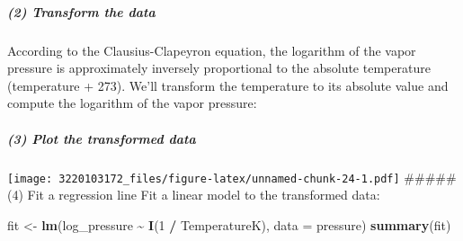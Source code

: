 \documentclass[
]{article}
\newenvironment{Shaded}{\begin{snugshade}}{\end{snugshade}}
\newcommand{\AttributeTok}[1]{\textcolor[rgb]{0.13,0.29,0.53}{#1}}
\newcommand{\DecValTok}[1]{\textcolor[rgb]{0.00,0.00,0.81}{#1}}
\newcommand{\FunctionTok}[1]{\textcolor[rgb]{0.13,0.29,0.53}{\textbf{#1}}}
\newcommand{\NormalTok}[1]{#1}
\newcommand{\OtherTok}[1]{\textcolor[rgb]{0.56,0.35,0.01}{#1}}
\newcommand{\SpecialCharTok}[1]{\textcolor[rgb]{0.81,0.36,0.00}{\textbf{#1}}}
\newcommand{\StringTok}[1]{\textcolor[rgb]{0.31,0.60,0.02}{#1}}
\begin{document}
\subparagraph{(2) Transform the data}\label{transform-the-data}

According to the Clausius-Clapeyron equation, the logarithm of the vapor
pressure is approximately inversely proportional to the absolute
temperature (temperature + 273). We'll transform the temperature to its
absolute value and compute the logarithm of the vapor pressure:

\begin{Shaded}
\end{Shaded}

\subparagraph{(3) Plot the transformed
data}\label{plot-the-transformed-data}

\begin{Shaded}
\end{Shaded}

\texttt{[image: 3220103172\_files/figure-latex/unnamed-chunk-24-1.pdf]}
\#\#\#\#\# (4) Fit a regression line Fit a linear model to the
transformed data:

\begin{Shaded}
\begin{Highlighting}[]
\NormalTok{fit }\OtherTok{\textless{}{-}} \FunctionTok{lm}\NormalTok{(log\_pressure }\SpecialCharTok{\textasciitilde{}} \FunctionTok{I}\NormalTok{(}\DecValTok{1} \SpecialCharTok{/}\NormalTok{ TemperatureK), }\AttributeTok{data =}\NormalTok{ pressure)}
\FunctionTok{summary}\NormalTok{(fit)}
\end{Highlighting}
\end{Shaded}
\end{document}
